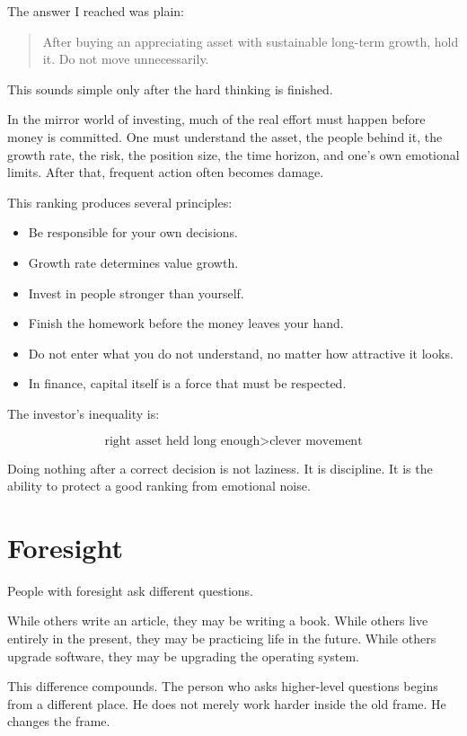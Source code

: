 The answer I reached was plain:

\begin{quote}
After buying an appreciating asset with sustainable long-term growth, hold it. Do not move unnecessarily.
\end{quote}

This sounds simple only after the hard thinking is finished.

In the mirror world of investing, much of the real effort must happen before money is committed. One must understand the asset, the people behind it, the growth rate, the risk, the position size, the time horizon, and one's own emotional limits. After that, frequent action often becomes damage.

This ranking produces several principles:

\begin{itemize}
\item Be responsible for your own decisions.
\item Growth rate determines value growth.
\item Invest in people stronger than yourself.
\item Finish the homework before the money leaves your hand.
\item Do not enter what you do not understand, no matter how attractive it looks.
\item In finance, capital itself is a force that must be respected.
\end{itemize}

The investor's inequality is:

\[
\text{right asset held long enough} > \text{clever movement}
\]

Doing nothing after a correct decision is not laziness. It is discipline. It is the ability to protect a good ranking from emotional noise.

\section*{Foresight}

People with foresight ask different questions.

While others write an article, they may be writing a book. While others live entirely in the present, they may be practicing life in the future. While others upgrade software, they may be upgrading the operating system.

This difference compounds. The person who asks higher-level questions begins from a different place. He does not merely work harder inside the old frame. He changes the frame.

